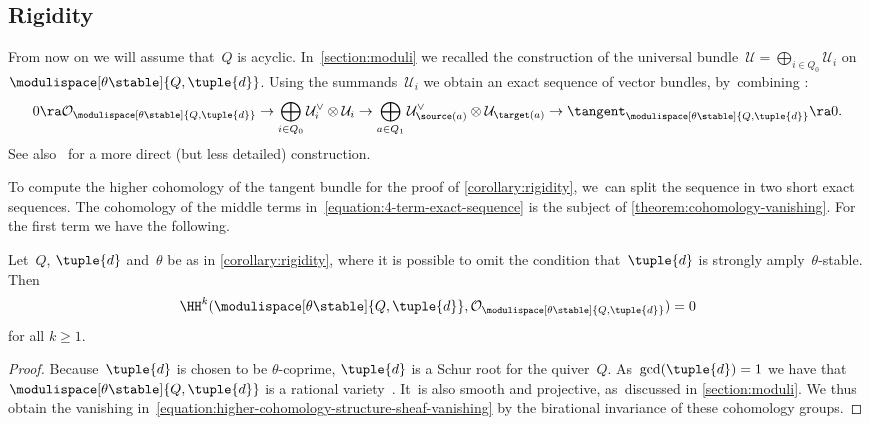 \subsection{Rigidity}
\label{subsection:rigidity}
From now on we will assume that~$Q$ is acyclic. In~\cref{section:moduli} we recalled the construction of the universal bundle~$\mathcal{U}=\bigoplus_{i\in Q_0}\mathcal{U}_i$
on~$\modulispace[\theta\stable]{Q,\tuple{d}}$.
\hbox{Using} the summands~$\mathcal{U}_i$ we obtain an exact sequence of vector bundles, by~combining \hbox{\cite[Prop.\,3.3 \& Prop.\,3.7]{MR4770368}}:
\begin{equation}
\label{equation:4-term-exact-sequence}
0
\ra\mathcal{O}_{\modulispace[\theta\stable]{Q,\tuple{d}}}
\to\bigoplus_{i \in Q_0} \mathcal{U}^\vee_i \otimes \mathcal{U}_i
\to\bigoplus_{a \in Q_1} \mathcal{U}^\vee_{\source(a)} \otimes \mathcal{U}_{\target(a)}
\to\tangent_{\modulispace[\theta\stable]{Q,\tuple{d}}}
\ra0.
\end{equation}
See also~\cite[\S 4.1]{MR4352662} for a more direct (but less detailed) construction.

To compute the higher cohomology of the tangent bundle for the proof of \cref{corollary:rigidity}, we~can split the sequence in two short exact sequences.
The cohomology of the middle terms in~\eqref{equation:4-term-exact-sequence}
is the subject of \cref{theorem:cohomology-vanishing}.
For the first term we have the following.

\begin{proposition}
Let~$Q$, $\tuple{d}$ and~$\theta$ be as in \cref{corollary:rigidity},
where it is possible to omit the condition that~$\tuple{d}$ is strongly amply~$\theta$-stable.
Then
\begin{equation}
\label{equation:higher-cohomology-structure-sheaf-vanishing}
\HH^k(\modulispace[\theta\stable]{Q,\tuple{d}},\mathcal{O}_{\modulispace[\theta\stable]{Q,\tuple{d}}}) = 0
\end{equation}
for all $k \geq 1$.
\end{proposition}

\begin{proof}
Because~$\tuple{d}$ is chosen to be $\theta$-coprime,
$\tuple{d}$ is a Schur root for the quiver~$Q$.
As~$\gcd(\tuple{d}) = 1$
we have that~$\modulispace[\theta\stable]{Q,\tuple{d}}$ is a rational variety~\cite[Th.\,6.4]{MR1914089}. It~is also smooth and projective, as~discussed in \cref{section:moduli}.
We thus obtain the vanishing in~\eqref{equation:higher-cohomology-structure-sheaf-vanishing}
by the birational invariance of these cohomology groups.
\end{proof}

